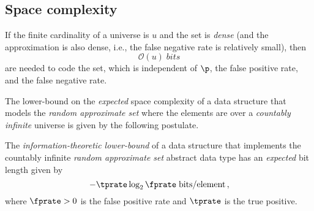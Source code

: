 \documentclass[ ../main.tex]{subfiles}
\begin{document}
\subsection{Space complexity}
\label{sec:space_comp}
If the finite cardinality of a universe is $u$ and the set is \emph{dense} (and the approximation is also dense, i.e., the false negative rate is relatively 
small), then
\begin{equation}
    \mathcal{O}(u) \; \si{bits}
\end{equation}
are needed to code the set, which is independent of $\p$, the false positive rate, and the false negative rate.

The lower-bound on the \emph{expected} space complexity of a data structure that models the \emph{random approximate set} where the elements are over a \emph{countably infinite} universe is given by the following postulate.
\begin{postulate}
\label{pst:approx_l_b}
The \emph{information-theoretic lower-bound} of a data structure that implements the countably infinite \emph{random approximate set} abstract data type has an \emph{expected} bit length given by
\begin{equation}
    -\tprate \log_2 \fprate \; \si{bits \per element}\,,
\end{equation}
where $\fprate > 0$ is the false positive rate and $\tprate$ is the true positive.
\end{postulate}
\end{document}
